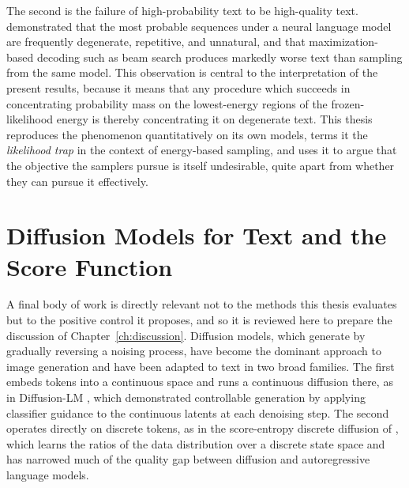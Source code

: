 The second is the failure of high-probability text to be high-quality text. \citet{holtzman2020curious} demonstrated that the most probable sequences under a neural language model are frequently degenerate, repetitive, and unnatural, and that maximization-based decoding such as beam search produces markedly worse text than sampling from the same model. This observation is central to the interpretation of the present results, because it means that any procedure which succeeds in concentrating probability mass on the lowest-energy regions of the frozen-likelihood energy is thereby concentrating it on degenerate text. This thesis reproduces the phenomenon quantitatively on its own models, terms it the \emph{likelihood trap} in the context of energy-based sampling, and uses it to argue that the objective the samplers pursue is itself undesirable, quite apart from whether they can pursue it effectively.

\section{Diffusion Models for Text and the Score Function}
\label{sec:rel-diffusion}

A final body of work is directly relevant not to the methods this thesis evaluates but to the positive control it proposes, and so it is reviewed here to prepare the discussion of Chapter~\ref{ch:discussion}. Diffusion models, which generate by gradually reversing a noising process, have become the dominant approach to image generation and have been adapted to text in two broad families. The first embeds tokens into a continuous space and runs a continuous diffusion there, as in Diffusion-LM \citep{li2022diffusion}, which demonstrated controllable generation by applying classifier guidance to the continuous latents at each denoising step. The second operates directly on discrete tokens, as in the score-entropy discrete diffusion of \citet{lou2024discrete}, which learns the ratios of the data distribution over a discrete state space and has narrowed much of the quality gap between diffusion and autoregressive language models.

